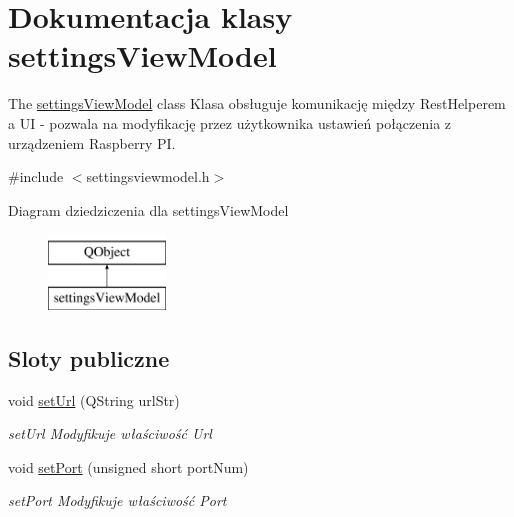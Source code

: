 \hypertarget{classsettings_view_model}{}\section{Dokumentacja klasy settings\+View\+Model}
\label{classsettings_view_model}


The \mbox{\hyperlink{classsettings_view_model}{settings\+View\+Model}} class Klasa obsługuje komunikację między Rest\+Helperem a UI -\/ pozwala na modyfikację przez użytkownika ustawień połączenia z urządzeniem Raspberry PI.  




{\ttfamily \#include $<$settingsviewmodel.\+h$>$}

Diagram dziedziczenia dla settings\+View\+Model\begin{figure}[H]
\begin{center}
\leavevmode
\includegraphics[height=2.000000cm]{classsettings_view_model}
\end{center}
\end{figure}
\subsection*{Sloty publiczne}
\begin{DoxyCompactItemize}
\item 
void \mbox{\hyperlink{classsettings_view_model_a2ffae7dd1ad8acfa8179366bdba7ec19}{set\+Url}} (Q\+String url\+Str)
\begin{DoxyCompactList}\small\item\em set\+Url Modyfikuje właściwość Url \end{DoxyCompactList}\item 
void \mbox{\hyperlink{classsettings_view_model_a893273de2f0be7d15d2c1e17ded4be0c}{set\+Port}} (unsigned short port\+Num)
\begin{DoxyCompactList}\small\item\em set\+Port Modyfikuje właściwość Port \end{DoxyCompactList}\end{DoxyCompactItemize}
